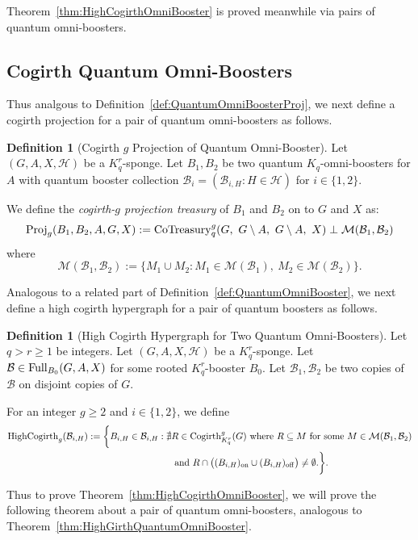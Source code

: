 \documentclass[11pt]{article}
\newcommand{\mc}[1]{\mathcal{#1}}
\newcounter{i}
\theoremstyle{plain}
\theoremstyle{plain} %
\theoremstyle{definition}
\newtheorem{definition}[thm]{Definition}
\begin{document}
Theorem~\ref{thm:HighCogirthOmniBooster} is proved meanwhile via pairs of quantum omni-boosters. 

\subsection{Cogirth Quantum Omni-Boosters}

Thus analgous to Definition~\ref{def:QuantumOmniBoosterProj}, we next define a cogirth projection for a pair of quantum omni-boosters as follows. 

\begin{definition}[Cogirth $g$ Projection of Quantum Omni-Booster]
Let $(G,A,X,\mc{H})$ be a $K_q^r$-sponge. Let $B_1,B_2$ be two quantum $K_q$-omni-boosters for $A$ with quantum booster collection $\mathcal{B}_i = (\mathcal{B}_{i,H}: H\in\mathcal{H})$ for $i\in \{1,2\}$.

We define the \emph{cogirth-$g$ projection treasury} of $B_1$ and $B_2$ on to $G$ and $X$ as: 
$${\rm Proj}_g(B_1,B_2,A,G,X):= {\rm CoTreasury}_q^g(G,~G\setminus A,~G\setminus A,~X) \perp \mathcal{M}(\mc{B}_1,\mc{B}_2)$$
where
$$\mathcal{M}(\mc{B}_1,\mc{B}_2) := \{ M_1\cup M_2: M_1\in \mc{M}(\mc{B}_1),~ M_2\in \mc{M}(\mc{B}_2)\}.$$
\end{definition}

Analogous to a related part of Definition~\ref{def:QuantumOmniBooster}, we next define a high cogirth hypergraph for a pair of quantum boosters as follows.

\begin{definition}[High Cogirth Hypergraph for Two Quantum Omni-Boosters]
Let $q > r\ge 1$ be integers. Let $(G,A,X,\mc{H})$ be a $K_q^r$-sponge. Let $\mc{B} \in {\rm Full}_{B_0}(G,A,X)$ for some rooted $K_q^r$-booster $B_0$.  Let $\mc{B}_1, \mc{B}_2$ be two copies of $\mc{B}$ on disjoint copies of $G$.

For an integer $g\ge 2$ and $i\in \{1,2\}$, we define
\begin{align*}{\rm HighCogirth}_g(\mathcal{B}_{i,H}) := \bigg\{B_{i,H} \in \mathcal{B}_{i,H}: \nexists &R\in {\rm Cogirth}_{K_q^r}^g(G) \text{ where } R\subseteq M \text{ for some } M \in \mc{M}(\mc{B}_1,\mc{B}_2) \\
&\text{ and } R\cap \big( (B_{i,H})_{\rm on}\cup (B_{i,H})_{\rm off}\big)\ne \emptyset. \bigg\}.
\end{align*}
\end{definition}

Thus to prove Theorem~\ref{thm:HighCogirthOmniBooster}, we will prove the following theorem about a pair of quantum omni-boosters, analogous to Theorem~\ref{thm:HighGirthQuantumOmniBooster}.
\end{document}
